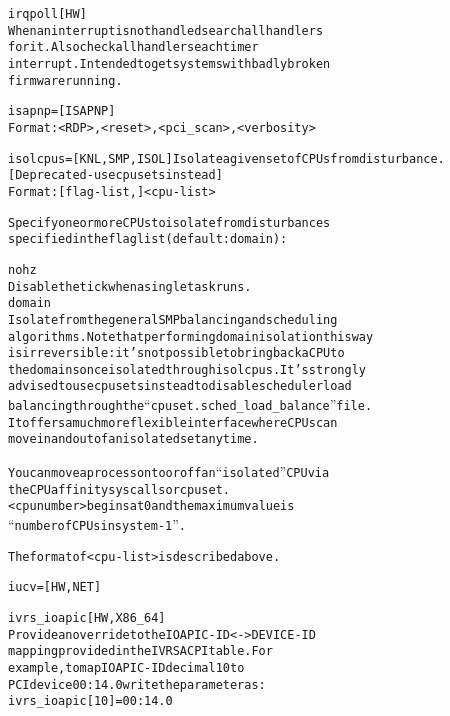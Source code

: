 \documentclass[a4paper,8pt,english]{sphinxmanual}
\begin{document}
\begin{alltt}
        irqpoll         {[}HW{]}
                        When an interrupt is not handled search all handlers
                        for it. Also check all handlers each timer
                        interrupt. Intended to get systems with badly broken
                        firmware running.

        isapnp=         {[}ISAPNP{]}
                        Format: \textless{}RDP\textgreater{},\textless{}reset\textgreater{},\textless{}pci\_scan\textgreater{},\textless{}verbosity\textgreater{}

        isolcpus=       {[}KNL,SMP,ISOL{]} Isolate a given set of CPUs from disturbance.
                        {[}Deprecated - use cpusets instead{]}
                        Format: {[}flag-list,{]}\textless{}cpu-list\textgreater{}

                        Specify one or more CPUs to isolate from disturbances
                        specified in the flag list (default: domain):

                        nohz
                          Disable the tick when a single task runs.
                        domain
                          Isolate from the general SMP balancing and scheduling
                          algorithms. Note that performing domain isolation this way
                          is irreversible: it's not possible to bring back a CPU to
                          the domains once isolated through isolcpus. It's strongly
                          advised to use cpusets instead to disable scheduler load
                          balancing through the ``cpuset.sched\_load\_balance'' file.
                          It offers a much more flexible interface where CPUs can
                          move in and out of an isolated set anytime.

                          You can move a process onto or off an ``isolated'' CPU via
                          the CPU affinity syscalls or cpuset.
                          \textless{}cpu number\textgreater{} begins at 0 and the maximum value is
                          ``number of CPUs in system - 1''.

                        The format of \textless{}cpu-list\textgreater{} is described above.



        iucv=           {[}HW,NET{]}

        ivrs\_ioapic     {[}HW,X86\_64{]}
                        Provide an override to the IOAPIC-ID\textless{}-\textgreater{}DEVICE-ID
                        mapping provided in the IVRS ACPI table. For
                        example, to map IOAPIC-ID decimal 10 to
                        PCI device 00:14.0 write the parameter as:
                                ivrs\_ioapic{[}10{]}=00:14.0


\end{alltt}
\end{document}
